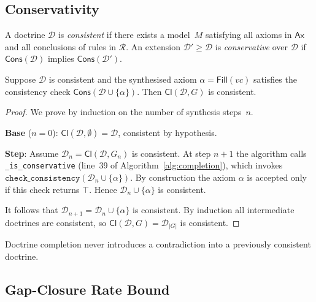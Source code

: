 \documentclass[11pt]{article}
\newcommand{\Doct}{\mathcal{D}}           %
\newcommand{\Ax}{\mathsf{Ax}}             %
\newcommand{\Rules}{\mathcal{R}}          %
\newcommand{\Fill}{\mathsf{Fill}}         %
\newcommand{\Cl}{\mathsf{Cl}}             %
\newcommand{\VC}{\mathit{vc}}             %
\newcommand{\Cons}{\mathsf{Cons}}         %
\begin{document}
\subsection{Conservativity}

\begin{definition}\label{def:cons}
A doctrine $\Doct$ is \emph{consistent} if there exists a model~$M$
satisfying all axioms in $\Ax$ and all conclusions of rules in $\Rules$.
An extension $\Doct' \geq \Doct$ is \emph{conservative} over $\Doct$
if $\Cons(\Doct)$ implies $\Cons(\Doct')$.
\end{definition}

\begin{theorem}\label{thm:conservativity}
Suppose $\Doct$ is consistent and the synthesised axiom $\alpha =
\Fill(\VC)$ satisfies the consistency check
$\Cons(\Doct \cup \{\alpha\})$.  Then $\Cl(\Doct, G)$ is consistent.
\end{theorem}
\begin{proof}
We prove by induction on the number of synthesis steps~$n$.

\textbf{Base} ($n=0$): $\Cl(\Doct, \emptyset) = \Doct$, consistent by
hypothesis.

\textbf{Step}: Assume $\Doct_n = \Cl(\Doct, G_n)$ is consistent.
At step $n{+}1$ the algorithm calls \texttt{\_is\_conservative}
(line~39 of Algorithm~\ref{alg:completion}), which invokes
$\texttt{check\_consistency}(\Doct_n \cup \{\alpha\})$.  By
construction the axiom $\alpha$ is accepted only if this check returns
$\top$.  Hence $\Doct_n \cup \{\alpha\}$ is consistent.

It follows that $\Doct_{n+1} = \Doct_n \cup \{\alpha\}$ is consistent.
By induction all intermediate doctrines are consistent, so
$\Cl(\Doct, G) = \Doct_{|G|}$ is consistent.
\end{proof}

\begin{corollary}\label{cor:no-contra}
Doctrine completion never introduces a contradiction into a
previously consistent doctrine.
\end{corollary}

\subsection{Gap-Closure Rate Bound}
\end{document}
